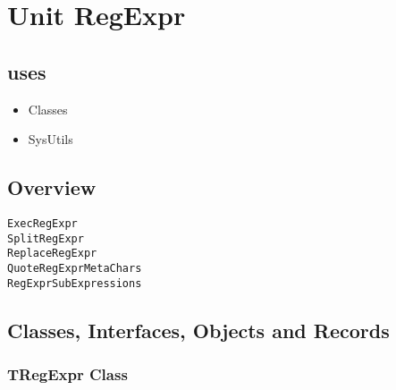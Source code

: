 \documentclass{report}
\newif\ifpdf
\begin{document}
\chapter{Unit RegExpr}
\label{RegExpr}
\section{uses}
\begin{itemize}
\item \begin{ttfamily}Classes\end{ttfamily}\item \begin{ttfamily}SysUtils\end{ttfamily}\end{itemize}
\section{Overview}
\begin{description}
\item[\texttt{\begin{ttfamily}TRegExpr\end{ttfamily} Class}]
\item[\texttt{\begin{ttfamily}ERegExpr\end{ttfamily} Class}]
\end{description}
\begin{description}
\item[\texttt{ExecRegExpr}]
\item[\texttt{SplitRegExpr}]
\item[\texttt{ReplaceRegExpr}]
\item[\texttt{QuoteRegExprMetaChars}]
\item[\texttt{RegExprSubExpressions}]
\end{description}
\section{Classes, Interfaces, Objects and Records}
\ifpdf
\subsection*{\large{\textbf{TRegExpr Class}}\normalsize\hspace{1ex}\hrulefill}
\else
\subsection*{TRegExpr Class}
\fi
\label{RegExpr.TRegExpr}
\end{document}
